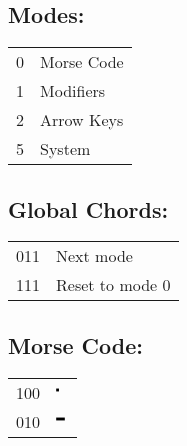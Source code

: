 \documentclass{book}
\def\dit{\rule[2.5pt]{2pt}{2pt}\hspace{2pt}}
\def\dah{\rule[2.5pt]{6pt}{2pt}\hspace{2pt}}
\begin{document}
\subsection*{Modes:}

\begin{center}
\begin{tabular} { c|l }
    0 & Morse Code \\
    1 & Modifiers \\
    2 & Arrow Keys \\
    5 & System
\end{tabular}
\end{center}

\subsection*{Global Chords:}
\begin{center}
\begin{tabular} { c|l }
    011 & Next mode \\
    111 & Reset to mode 0 
\end{tabular}
\end{center}

\subsection*{Morse Code:}
\begin{center}
\begin{tabular} { c|l }
    100 & $\dit$ \\
    010 & $\dah$
\end{tabular}
\end{center}
\end{document}

